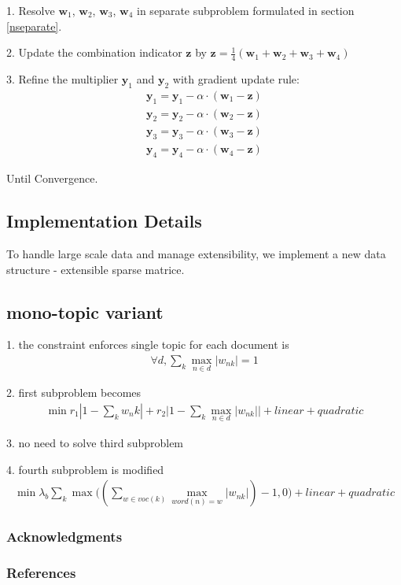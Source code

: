 \documentclass{article} %
\newcommand{\wone}{\mathbf{w}_1}
\newcommand{\wtwo}{\mathbf{w}_2}
\newcommand{\wthree}{\mathbf{w}_3}
\newcommand{\wfour}{\mathbf{w}_4}
\newcommand{\yone}{\mathbf{y}_1}
\newcommand{\ytwo}{\mathbf{y}_2}
\newcommand{\ythree}{\mathbf{y}_3}
\newcommand{\yfour}{\mathbf{y}_4}
\newcommand{\z}{\mathbf{z}}
\begin{document}
1. Resolve $\wone$, $\wtwo$, $\wthree$, $\wfour$ in separate subproblem
formulated in section \ref{nseparate}.

2. Update the combination indicator $\z$ by $\z = \frac{1}{4} (\wone + \wtwo +
\wthree + \wfour)$

3. Refine the multiplier $\yone$ and $\ytwo$ with gradient update rule: 
\begin{align}
\yone = \yone - \alpha \cdot (\wone - \z) \\
\ytwo = \ytwo - \alpha \cdot (\wtwo - \z) \\ 
\ythree = \ythree - \alpha \cdot (\wthree - \z) \\
\yfour = \yfour - \alpha \cdot (\wfour - \z)
\end{align}

Until Convergence.

\subsection{Implementation Details}
To handle large scale data and manage extensibility, we implement a new data
structure - extensible sparse matrice. 

\subsection{mono-topic variant}
1. the constraint enforces single topic for each document is 
\begin{align}
    \forall d, \sum_k \max_{n \in d} |w_{nk}| = 1
   \end{align}
   
2. first subproblem becomes
\begin{align}
    \min r_1 |1-\sum_k w_nk| + r_2 \big| 1-\sum_k \max_{n \in d} |w_{nk}| \big| + linear + quadratic
   \end{align}

3. no need to solve third subproblem

4. fourth subproblem is modified
\begin{align}
    \min \lambda_b \sum_k \max \big((\sum_{w \in voc(k)} \max_{word(n)=w}
    |w_{nk}|) -1, 0\big) + linear + quadratic
   \end{align}
\newpage
\subsubsection*{Acknowledgments}

\subsubsection*{References}
\small{

}
\end{document}
